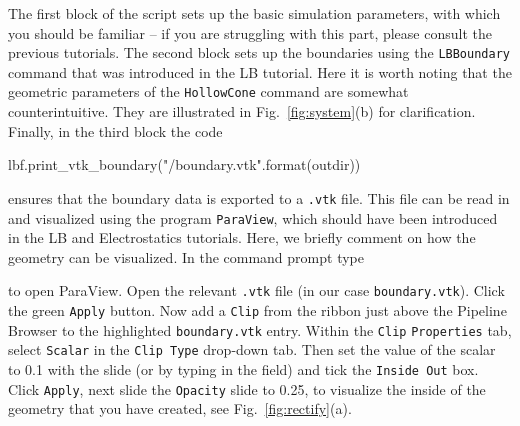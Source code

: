 \documentclass[aip,jcp,reprint,a4paper,onecolumn,amsmath]{revtex4-1}
\newcommand\code{\lstinline}
\newcommand\codees{\lstinline[language=python]}
\begin{document}
The first block of the script sets up the basic simulation parameters, with which you should be familiar -- if you are struggling with this part, please consult the previous tutorials. The second block sets up the boundaries using the \codees{LBBoundary} command that was introduced in the LB tutorial. Here it is worth noting that the geometric parameters of the \codees{HollowCone} command are somewhat counterintuitive. They are illustrated in Fig.~\ref{fig:system}(b) for clarification. Finally, in the third block the code
\begin{espresso}
lbf.print_vtk_boundary("{}/boundary.vtk".format(outdir))
\end{espresso}
ensures that the boundary data is exported to a \codees{.vtk} file. This file can be read in and visualized using the program \code{ParaView}, which should have been introduced in the LB and Electrostatics tutorials. Here, we briefly comment on how the geometry can be visualized. In the command prompt type
to open ParaView. Open the relevant \code{.vtk} file (in our case \code{boundary.vtk}). Click the green \code{Apply} button. Now add a \code{Clip} from the ribbon just above the Pipeline Browser to the highlighted \code{boundary.vtk} entry. Within the \code{Clip} \code{Properties} tab, select \code{Scalar} in the \code{Clip Type} drop-down tab. Then set the value of the scalar to 0.1 with the slide (or by typing in the field) and tick the \code{Inside Out} box. Click \code{Apply}, next slide the \code{Opacity} slide to 0.25, to visualize the inside of the geometry that you have created, see Fig.~\ref{fig:rectify}(a).
\end{document}
